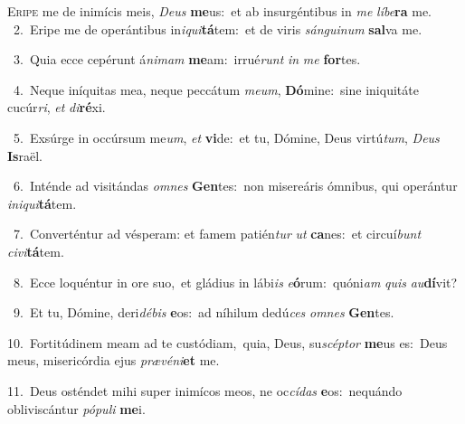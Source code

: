 \lettrine{\initial\textcolor{\initialcolor}{E}}{ripe} me de inimícis meis, \textit{De}\-\textit{us} \textbf{me}\-us:~\star et ab insurgéntibus in \textit{me} \textit{lí}\-\textit{be}\textbf{ra} me.\\
{\numbfont\textcolor{\numbcolor}{~2.}}~Eripe me de operántibus in\-\textit{i}\-\textit{qui}\textbf{tá}tem:~\star et de viris \textit{sán}\-\textit{gui}\textit{num} \textbf{sal}\-va me.\par
{\numbfont\textcolor{\numbcolor}{~3.}}~Quia ecce cepérunt á\-\textit{ni}\-\textit{mam} \textbf{me}\-am:~\star irrué\textit{runt} \textit{in} \textit{me} \textbf{for}\-tes.\par
{\numbfont\textcolor{\numbcolor}{~4.}}~Neque iníquitas mea, neque peccátum \textit{me}\-\textit{um}, \textbf{Dó}\-mine:~\star sine iniquitáte cucúr\-\textit{ri}\-, \textit{et} \textit{di}\-\textbf{ré}xi.\par
{\numbfont\textcolor{\numbcolor}{~5.}}~Exsúrge in occúrsum me\-\textit{um}\-, \textit{et} \textbf{vi}\-de:~\star et tu, Dómine, Deus virtú\-\textit{tum}\-, \textit{De}\-\textit{us} \textbf{Is}\-raël.\par
{\numbfont\textcolor{\numbcolor}{~6.}}~Inténde ad visitándas \textit{om}\-\textit{nes} \textbf{Gen}\-tes:~\star non misereáris ómnibus, qui operántur \textit{in}\-\textit{i}\textit{qui}\textbf{tá}tem.\par
{\numbfont\textcolor{\numbcolor}{~7.}}~Converténtur ad vésperam: et famem patién\textit{tur} \textit{ut} \textbf{ca}\-nes:~\star et circuí\textit{bunt} \textit{ci}\-\textit{vi}\textbf{tá}tem.\par
{\numbfont\textcolor{\numbcolor}{~8.}}~Ecce loquéntur in ore suo,~\dagger et gládius in lábi\textit{is} \textit{e}\-\textbf{ó}rum:~\star quóni\textit{am} \textit{quis} \textit{au}\-\textbf{dí}vit?\par
{\numbfont\textcolor{\numbcolor}{~9.}}~Et tu, Dómine, deri\-\textit{dé}\-\textit{bis} \textbf{e}\-os:~\star ad níhilum dedú\textit{ces} \textit{om}\-\textit{nes} \textbf{Gen}\-tes.\par
{\numbfont\textcolor{\numbcolor}{10.}}~Fortitúdinem meam ad te custódiam,~\dagger quia, Deus, su\-\textit{scép}\-\textit{tor} \textbf{me}\-us es:~\star Deus meus, misericórdia ejus \textit{præ}\-\textit{vé}\textit{ni}\textbf{et} me.\par
{\numbfont\textcolor{\numbcolor}{11.}}~Deus osténdet mihi super inimícos meos, ne oc\-\textit{cí}\-\textit{das} \textbf{e}\-os:~\star nequándo obliviscántur \textit{pó}\-\textit{pu}\textit{li} \textbf{me}\-i.\par
